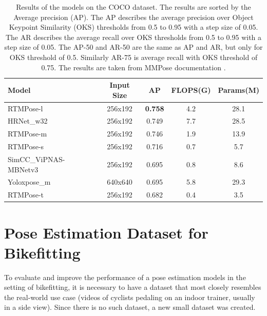 \begin{table}[htbp]
    \setlength{\tabcolsep}{4pt}
    \centering
    \begin{tabular}{lcccc}
        \toprule
        \textbf{Model}        & \textbf{Input Size} & \textbf{AP}    & \textbf{FLOPS(G)} & \textbf{Params(M)} \\
        \midrule
        RTMPose-l             & 256x192             & \textbf{0.758} & 4.2               & 28.1               \\
        HRNet\_w32            & 256x192             & 0.749          & 7.7               & 28.5               \\
        RTMPose-m             & 256x192             & 0.746          & 1.9               & 13.9               \\
        RTMPose-s             & 256x192             & 0.716          & 0.7               & 5.7                \\
        SimCC\_ViPNAS-MBNetv3 & 256x192             & 0.695          & 0.8               & 8.6                \\
        Yoloxpose\_m          & 640x640             & 0.695          & 5.8               & 29.3               \\
        RTMPose-t             & 256x192             & 0.682          & 0.4               & 3.5                \\


        \bottomrule
    \end{tabular}
    \caption{Results of the models on the COCO dataset. The results are sorted by the Average precision (AP). The AP describes the average precision over Object Keypoint Similarity (OKS) thresholds from 0.5 to 0.95 with a step size of 0.05. The AR describes the average recall over OKS thresholds from 0.5 to 0.95 with a step size of 0.05. The AP-50 and AR-50 are the same as AP and AR, but only for OKS threshold of 0.5. Similarly AR-75 is average recall with OKS threshold of 0.75. The results are taken from MMPose documentation \cite{mmpose2020}.}
    \label{tab:evaluation_params}

\end{table}


\chapter{Pose Estimation Dataset for Bikefitting}
\label{ch:dataset}
To evaluate and improve the performance of a pose estimation models in the setting of bikefitting, it is necessary to have a dataset that most closely resembles the real-world use case (videos of cyclists pedaling on an indoor trainer, usually in a side view). Since there is no such dataset, a new small dataset was created.

